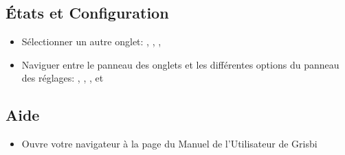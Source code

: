 \subsection{États et Configuration}

\begin{itemize}
	\item Sélectionner un autre onglet: , , , 
	\item Naviguer entre le panneau des onglets et les différentes options du panneau des réglages: , , ,  et 
\end{itemize}

\subsection{Aide}

\begin{itemize}
	\item Ouvre votre navigateur à la page du Manuel de l'Utilisateur de Grisbi 
\end{itemize}













